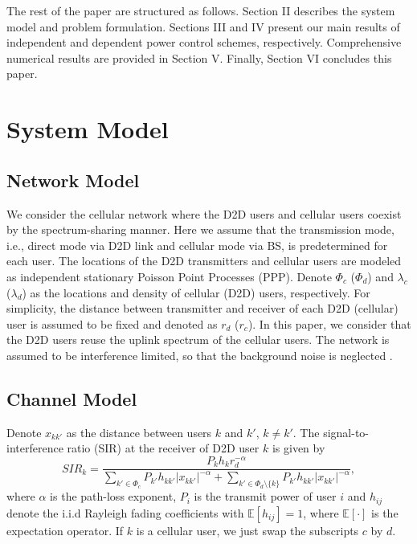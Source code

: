 \documentclass[12pt, draftclsnofoot, journal, letterpaper, onecolumn]{IEEEtran}
\begin{document}
The rest of the paper are structured as follows. Section II describes the system model and problem formulation. Sections III and IV present our main results of independent and dependent power control schemes, respectively. Comprehensive numerical results are provided in Section V. Finally, Section VI concludes this paper.

\section{System Model}
\subsection{Network Model}

We consider the cellular network where the D2D users and cellular users coexist by the spectrum-sharing manner. Here we assume that the transmission mode, i.e., direct mode via D2D link and cellular mode via BS, is predetermined for each user. The locations of the D2D transmitters and cellular users are modeled as independent stationary Poisson Point Processes (PPP). Denote $\Phi_c $ ($\Phi_d$) and $\lambda_c $ ($\lambda_d$) as the locations and density of cellular (D2D) users, respectively. For simplicity, the distance between transmitter and receiver of each D2D (cellular) user is assumed to be fixed and denoted as $r_d$ ($r_c$).
In this paper, we consider that the D2D users reuse the uplink spectrum of the cellular users. The network is assumed to be interference limited, so that the background noise is neglected \cite{overlaid,SGLD}.

\subsection{Channel Model}

Denote $x_{kk'}$  as the distance between users $k$ and $k'$, $k\neq k'$.
The signal-to-interference ratio (SIR) at the receiver of D2D user $k$ is given by
\begin{equation}
SIR_k=\frac{P_kh_kr_d^{-\alpha}}{\sum_{k'\in\Phi_c}P_{k'}h_{kk'}|x_{kk'}|^{-\alpha}+\sum_{k'\in\Phi_d\setminus \{k\}}P_{k'}h_{kk'}|x_{kk'}|^{-\alpha}},
\end{equation}
where $\alpha$ is the path-loss exponent, $P_i$ is the transmit power of user $i$ and $h_{ij}$ denote the i.i.d Rayleigh fading coefficients with $\mathbb{E}[h_{ij}]=1$, where $\mathbb{E}[\cdot]$ is the expectation operator.
If $k$ is a cellular user, we just swap the subscripts $c$ by $d$.
\end{document}
